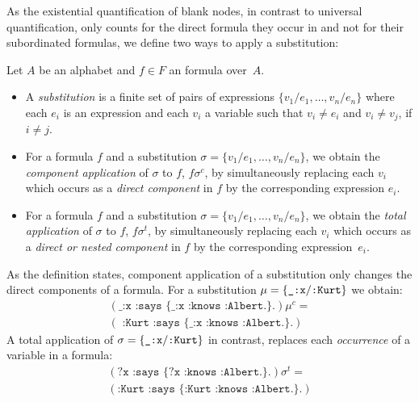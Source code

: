As the existential quantification of blank nodes, in contrast to universal quantification, 
only counts for the direct formula they occur in and not for their subordinated formulas, 
we define two ways to apply a substitution:


\begin{definition}[Substitution]
%
Let $A$ be an \nthree alphabet 
and $f\in F$ an \nthree formula over~$A$. 
\begin{itemize}
 \item A \emph{substitution} is a finite set of pairs of expressions $\{v_1/e_1, \ldots, v_n/e_n\}$ where each $e_i$ is an expression and each $v_i$ 
 a variable such that $v_i\neq e_i$ and 
 $v_i \neq v_j$,
 if $i\neq j$.  
 \item 
 For a formula $f$ and a substitution $\sigma=\{v_1/e_1, \ldots, v_n/e_n\}$, we obtain the \emph{component application} 
 of $\sigma$ to $f$, $f\sigma^c$, by simultaneously replacing each $v_i$ 
 which occurs as a \emph{direct component} in $f$ by the corresponding expression $e_i$. 
 \item 
 For a formula $f$ and a substitution $\sigma=\{v_1/e_1, \ldots, v_n/e_n\}$, we obtain the \emph{total application} of $\sigma$ to $f$, $f\sigma^t$, 
 by simultaneously replacing each $v_i$ 
 which occurs as a \emph{direct or nested component} in $f$ by the corresponding expression~$e_i$. 
 \end{itemize}
\end{definition}

As the definition states, component application of a substitution only changes the direct components of a formula. 
For a substitution $\mu=\{\verb!_:x!/ \verb!:Kurt!\}$ we obtain:
\begin{multline}
(\texttt{\_:x :says \{\_:x :knows :Albert.\}.})\mu^c  =\nonumber \\ (\texttt{ :Kurt :says \{\_:x :knows :Albert.\}.})\nonumber
\end{multline}
A total application of $\sigma=\{\verb!_:x!/ \verb!:Kurt!\}$ in contrast, replaces each \emph{occurrence} of a variable in a formula: 
\begin{multline}
(\texttt{?x :says \{?x :knows :Albert.\}.})\sigma^t =\\ (\texttt{:Kurt :says \{:Kurt :knows :Albert.\}.})\nonumber
\end{multline}







